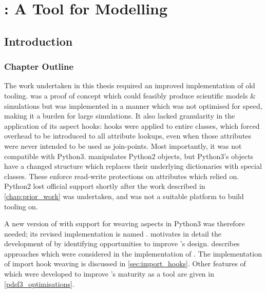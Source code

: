 \chapter{\pdsfthree{}: A Tool for \AspectOriented Modelling}
\label{chap:pdsf_rewrite}




\section{Introduction}

\subsection{Chapter Outline}

The work undertaken in this thesis required an improved implementation of old
tooling. \pydysofu{} was a proof of concept which could feasibly produce
scientific models \& simulations but was implemented in a manner which was not
optimised for speed, making it a burden for large simulations. It also lacked
granularity in the application of its aspect hooks: hooks were applied to entire
classes, which forced overhead to be introduced to all attribute lookups, even
when those attributes were never intended to be used as join-points. Most
importantly, it was not compatible with Python3. \pydysofu{} manipulates Python2
objects, but Python3's objects have a changed structure which replaces their
underlying dictionaries with special classes. These enforce read-write
protections on attributes which \pydysofu{} relied on. Python2 lost official
support shortly after the work described in \cref{chap:prior_work} was
undertaken, and was not a suitable platform to build tooling on.

A new version of \pydysofu{} with support for weaving aspects in Python3 was
therefore needed; its revised implementation is named \pdsfthree{}.
 motivates in detail the development of \pdsfthree
by identifying opportunities to improve \pydysofu{}'s design.
 describes approaches which were considered in the
implementation of \pdsfthree{}. The implementation of import hook weaving is
discussed in \cref{sec:import_hooks}. Other features of \pdsfthree which were
developed to improve \pydysofu{}'s maturity as a tool are given in
\cref{pdsf3_optimisations}.


